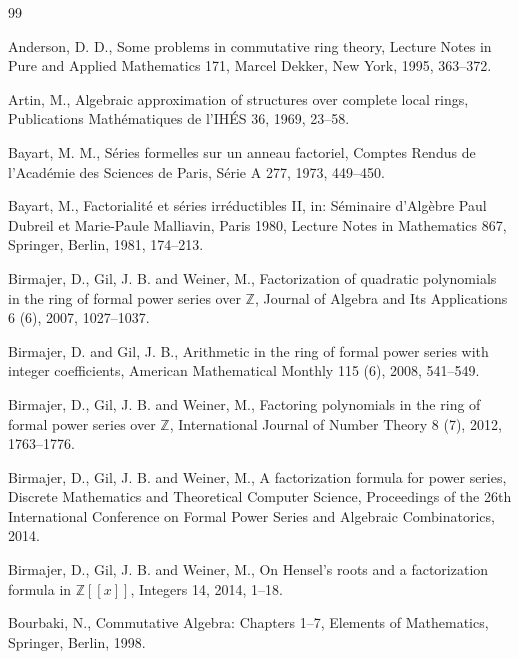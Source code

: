 \documentclass{article}
\newcommand{\Z}{\mathbb{Z}}
\theoremstyle{plain}
\theoremstyle{definition}
\theoremstyle{remark}
\theoremstyle{plain}
\begin{document}

\begin{thebibliography}{99}

 Anderson, D. D., Some problems in commutative ring theory, Lecture Notes in Pure and Applied Mathematics 171, Marcel Dekker, New York, 1995, 363--372.

 Artin, M., Algebraic approximation of structures over complete local rings, Publications Math\'ematiques de l'IH\'ES 36, 1969, 23--58.

 Bayart, M. M., S\'eries formelles sur un anneau factoriel, Comptes Rendus de l'Acad\'emie des Sciences de Paris, S\'erie A 277, 1973, 449--450.

 Bayart, M., Factorialit\'e et s\'eries irr\'eductibles II, in: S\'eminaire d'Alg\`ebre Paul Dubreil et Marie-Paule Malliavin, Paris 1980, Lecture Notes in Mathematics 867, Springer, Berlin, 1981, 174--213.

 Birmajer, D., Gil, J. B. and Weiner, M., Factorization of quadratic polynomials in the ring of formal power series over $\Z$, Journal of Algebra and Its Applications 6 (6), 2007, 1027--1037.

 Birmajer, D. and Gil, J. B., Arithmetic in the ring of formal power series with integer coefficients, American Mathematical Monthly 115 (6), 2008, 541--549.

 Birmajer, D., Gil, J. B. and Weiner, M., Factoring polynomials in the ring of formal power series over $\Z$, International Journal of Number Theory 8 (7), 2012, 1763--1776.

 Birmajer, D., Gil, J. B. and Weiner, M., A factorization formula for power series, Discrete Mathematics and Theoretical Computer Science, Proceedings of the 26th International Conference on Formal Power Series and Algebraic Combinatorics, 2014.

 Birmajer, D., Gil, J. B. and Weiner, M., On Hensel's roots and a factorization formula in $\Z[[x]]$, Integers 14, 2014, 1--18.

 Bourbaki, N., Commutative Algebra: Chapters 1--7, Elements of Mathematics, Springer, Berlin, 1998.



\end{thebibliography}
\end{document}

